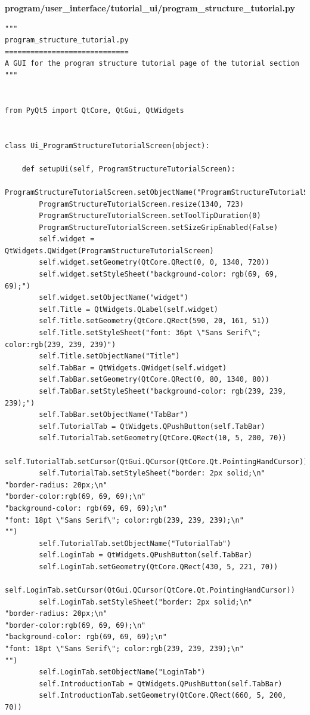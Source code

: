 \documentclass[12pt]{article}
\begin{document}
\textbf{program/user\_interface/tutorial\_ui/program\_structure\_tutorial.py}
\begin{lstlisting}
"""
program_structure_tutorial.py
=============================
A GUI for the program structure tutorial page of the tutorial section
"""


from PyQt5 import QtCore, QtGui, QtWidgets


class Ui_ProgramStructureTutorialScreen(object):

    def setupUi(self, ProgramStructureTutorialScreen):
        ProgramStructureTutorialScreen.setObjectName("ProgramStructureTutorialScreen")
        ProgramStructureTutorialScreen.resize(1340, 723)
        ProgramStructureTutorialScreen.setToolTipDuration(0)
        ProgramStructureTutorialScreen.setSizeGripEnabled(False)
        self.widget = QtWidgets.QWidget(ProgramStructureTutorialScreen)
        self.widget.setGeometry(QtCore.QRect(0, 0, 1340, 720))
        self.widget.setStyleSheet("background-color: rgb(69, 69, 69);")
        self.widget.setObjectName("widget")
        self.Title = QtWidgets.QLabel(self.widget)
        self.Title.setGeometry(QtCore.QRect(590, 20, 161, 51))
        self.Title.setStyleSheet("font: 36pt \"Sans Serif\"; color:rgb(239, 239, 239)")
        self.Title.setObjectName("Title")
        self.TabBar = QtWidgets.QWidget(self.widget)
        self.TabBar.setGeometry(QtCore.QRect(0, 80, 1340, 80))
        self.TabBar.setStyleSheet("background-color: rgb(239, 239, 239);")
        self.TabBar.setObjectName("TabBar")
        self.TutorialTab = QtWidgets.QPushButton(self.TabBar)
        self.TutorialTab.setGeometry(QtCore.QRect(10, 5, 200, 70))
        self.TutorialTab.setCursor(QtGui.QCursor(QtCore.Qt.PointingHandCursor))
        self.TutorialTab.setStyleSheet("border: 2px solid;\n"
"border-radius: 20px;\n"
"border-color:rgb(69, 69, 69);\n"
"background-color: rgb(69, 69, 69);\n"
"font: 18pt \"Sans Serif\"; color:rgb(239, 239, 239);\n"
"")
        self.TutorialTab.setObjectName("TutorialTab")
        self.LoginTab = QtWidgets.QPushButton(self.TabBar)
        self.LoginTab.setGeometry(QtCore.QRect(430, 5, 221, 70))
        self.LoginTab.setCursor(QtGui.QCursor(QtCore.Qt.PointingHandCursor))
        self.LoginTab.setStyleSheet("border: 2px solid;\n"
"border-radius: 20px;\n"
"border-color:rgb(69, 69, 69);\n"
"background-color: rgb(69, 69, 69);\n"
"font: 18pt \"Sans Serif\"; color:rgb(239, 239, 239);\n"
"")
        self.LoginTab.setObjectName("LoginTab")
        self.IntroductionTab = QtWidgets.QPushButton(self.TabBar)
        self.IntroductionTab.setGeometry(QtCore.QRect(660, 5, 200, 70))

\end{lstlisting}
\end{document}
